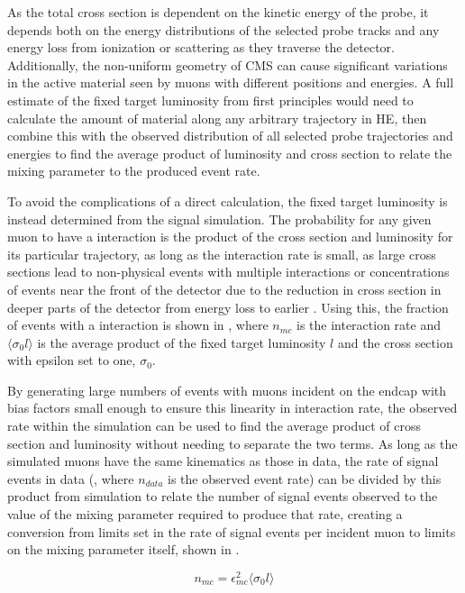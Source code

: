 As the total cross section is dependent on the kinetic energy of the probe, it depends both on the energy distributions of the selected probe tracks and any energy loss from ionization or scattering as they traverse the detector.
Additionally, the non-uniform geometry of CMS can cause significant variations in the active material seen by muons with different positions and energies. 
A full estimate of the fixed target luminosity from first principles would need to calculate the amount of material along any arbitrary trajectory in HE, then combine this with the observed distribution of all selected probe trajectories and energies to find the average product of luminosity and cross section to relate the mixing parameter to the produced event rate.

To avoid the complications of a direct calculation, the fixed target luminosity is instead determined from the signal simulation.
The probability for any given muon to have a \dbrem interaction is the product of the cross section and luminosity for its particular trajectory, as long as the interaction rate is small, as large cross sections lead to non-physical events with multiple \dbrem interactions or concentrations of \dbrem events near the front of the detector due to the reduction in cross section in deeper parts of the detector from energy loss to earlier \dbrem. 
Using this, the fraction of events with a \dbrem interaction is shown in , where $n_{mc}$ is the interaction rate and $\langle \sigma_0 l \rangle$ is the average product of the fixed target luminosity $l$ and the cross section with epsilon set to one, $\sigma_0$.  

By generating large numbers of events with muons incident on the endcap with bias factors small enough to ensure this linearity in interaction rate, the observed rate within the simulation can be used to find the average product of cross section and luminosity without needing to separate the two terms.
As long as the simulated muons have the same kinematics as those in data, the rate of signal events in data (, where $n_{data}$ is the observed event rate) can be divided by this product from simulation to relate the number of signal events observed to the value of the mixing parameter required to produce that rate, creating a conversion from limits set in the rate of signal events per incident muon to limits on the mixing parameter itself, shown in .

\begin{equation}
	\label{eq:mcrate}
	n_{mc} = \epsilon_{mc}^2 \langle \sigma_0 l \rangle
\end{equation}


